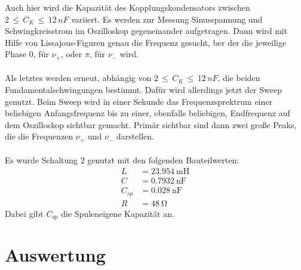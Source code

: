\documentclass[
  bibliography=totoc,     %
  captions=tableheading,  %
  titlepage=firstiscover, %
]{scrartcl}
\begin{document}
Auch hier wird die Kapazität des Kopplungskondensators zwischen
$2\,\leq\,C_K\,\leq\,12\,nF$ variiert. Es werden zur Messung Sinusspannung
und Schwingkreisstrom im Oszilloskop gegeneinander aufgetragen. Dann wird
mit Hilfe von Lissajous-Figuren genau die Frequenz gesucht, ber der die
jeweilige Phase 0, für $\nu_+$, oder $\pi$, für $\nu_-$ wird.\\
\\
Als letztes werden erneut, abhängig von $2\,\leq\,C_K\,\leq\,12\,nF$, die beiden
Fundamentalschwingungen bestimmt. Dafür wird allerdings jetzt der Sweep genutzt.
Beim Sweep wird in einer Sekunde das Frequenzsprektrum einer beliebigen
Anfangsfrequenz bis zu einer, ebenfalls beliebigen, Endfrequenz auf dem
Oszilloskop sichtbar gemacht. Primär sichtbar sind dann zwei große Peaks,
die die Frequenzen $\nu_+$ und $\nu_-$ darstellen.\\
\\
Es wurde Schaltung 2 genutzt mit den folgenden Bauteilwerten:
\begin{align}
  L&=\SI{23.954}{\milli\henry} \\
  C&=\SI{0.7932}{\nano\farad} \\
  C_{sp}&=\SI{0.028}{\nano\farad}\\
  R &= \SI{48}{\ohm}
\end{align}
Dabei gibt $C_\mathup{sp}$ die Spuleneigene Kapazität an.
\clearpage
\section{Auswertung}
\label{sec:auswertung}
\end{document}
